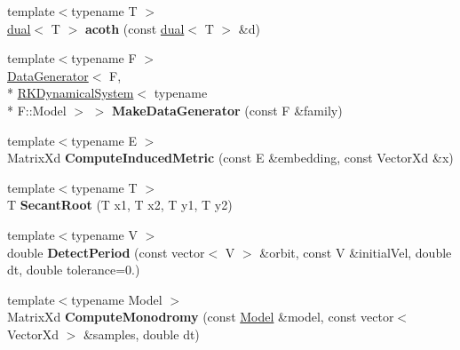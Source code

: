 \begin{DoxyCompactItemize}
\item 
\hypertarget{namespace_d_r_d_s_p_a8ea942ba72f5e5db0d5dd14563d5cf3e}{{\footnotesize template$<$typename T $>$ }\\\hyperlink{struct_d_r_d_s_p_1_1dual}{dual}$<$ T $>$ {\bfseries acoth} (const \hyperlink{struct_d_r_d_s_p_1_1dual}{dual}$<$ T $>$ \&d)}\label{namespace_d_r_d_s_p_a8ea942ba72f5e5db0d5dd14563d5cf3e}

\item 
\hypertarget{namespace_d_r_d_s_p_af3ee0bfe0ba3d52879952a631b8189c6}{{\footnotesize template$<$typename F $>$ }\\\hyperlink{struct_d_r_d_s_p_1_1_data_generator}{Data\-Generator}$<$ F, \\*
\hyperlink{struct_d_r_d_s_p_1_1_r_k_dynamical_system}{R\-K\-Dynamical\-System}$<$ typename \\*
F\-::\-Model $>$ $>$ {\bfseries Make\-Data\-Generator} (const F \&family)}\label{namespace_d_r_d_s_p_af3ee0bfe0ba3d52879952a631b8189c6}

\item 
\hypertarget{namespace_d_r_d_s_p_ac9f2df4bb7e0ab3ef94dca7616cdbc3a}{{\footnotesize template$<$typename E $>$ }\\Matrix\-Xd {\bfseries Compute\-Induced\-Metric} (const E \&embedding, const Vector\-Xd \&x)}\label{namespace_d_r_d_s_p_ac9f2df4bb7e0ab3ef94dca7616cdbc3a}

\item 
\hypertarget{namespace_d_r_d_s_p_ae431e14d8b53858737b1183527375fe1}{{\footnotesize template$<$typename T $>$ }\\T {\bfseries Secant\-Root} (T x1, T x2, T y1, T y2)}\label{namespace_d_r_d_s_p_ae431e14d8b53858737b1183527375fe1}

\item 
\hypertarget{namespace_d_r_d_s_p_aeefcd5a2eea25ee6c645c559f6fa4c76}{{\footnotesize template$<$typename V $>$ }\\double {\bfseries Detect\-Period} (const vector$<$ V $>$ \&orbit, const V \&initial\-Vel, double dt, double tolerance=0.)}\label{namespace_d_r_d_s_p_aeefcd5a2eea25ee6c645c559f6fa4c76}

\item 
\hypertarget{namespace_d_r_d_s_p_a3dbe23e49cdb6cfa8507b19682cf3df2}{{\footnotesize template$<$typename Model $>$ }\\Matrix\-Xd {\bfseries Compute\-Monodromy} (const \hyperlink{struct_d_r_d_s_p_1_1_model}{Model} \&model, const vector$<$ Vector\-Xd $>$ \&samples, double dt)}\label{namespace_d_r_d_s_p_a3dbe23e49cdb6cfa8507b19682cf3df2}


\end{DoxyCompactItemize}
